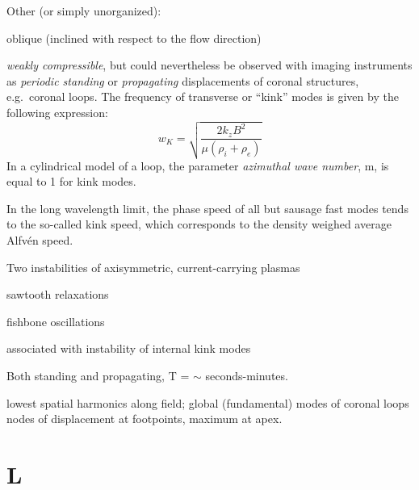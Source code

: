 \documentclass[12pt]{article}
\begin{document}
Other (or simply unorganized):
\begin{itemize*}
    \item oblique (inclined with respect to the flow direction)
    \item \emph{weakly compressible}, but could nevertheless be
        observed with imaging instruments as \emph{periodic standing}
        or \emph{propagating} displacements of coronal structures, e.g.\ coronal loops.
        The frequency of transverse or ``kink'' modes is given by the following expression:
            $$ w_K = \sqrt{ \frac{2k_zB^2}{\mu(\rho_i+\rho_e)}  }   $$
        In a cylindrical model of a loop,
        the parameter \emph{azimuthal wave number},
        m, is equal to 1 for kink modes.
    \item In the long wavelength limit, the phase speed of all but
        sausage fast modes tends to the so-called kink speed,
        which corresponds to the density weighed average Alfv\'en speed.
    \item Two instabilities of axisymmetric, current-carrying plasmas
        \begin{itemize*}
            \item sawtooth relaxations
            \item fishbone oscillations
        \end{itemize*}
        associated with instability of internal kink modes
    \item Both standing and propagating, T = $\sim$ seconds-minutes.
    \item lowest spatial harmonics along field; global (fundamental)
        modes of coronal loops nodes of displacement at footpoints,
        maximum at apex.
\end{itemize*}


\section*{L}
\end{document}
